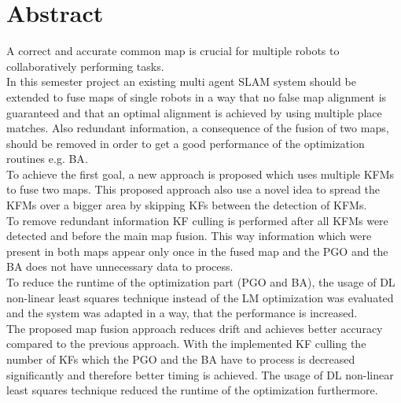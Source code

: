 \chapter*{Abstract}

A correct and accurate common map is crucial for multiple robots to collaboratively performing tasks.\\

In this semester project an existing multi agent \ac{SLAM} system should be extended to fuse maps of single robots in a way that no false map alignment is guaranteed and that an optimal alignment is achieved by using multiple place matches. Also redundant information, a consequence of the fusion of two maps, should be removed in order to get a good performance of the optimization routines e.g. \ac{BA}.\\

To achieve the first goal, a new approach is proposed which uses multiple \acfp{KFM} to fuse two maps. This proposed approach also use a novel idea to spread the \acp{KFM} over a bigger area by skipping \acfp{KF} between the detection of \acp{KFM}.\\
To remove redundant information \ac{KF} culling is performed after all \acp{KFM} were detected and before the main map fusion. This way information which were present in both maps appear only once in the fused map and the \ac{PGO} and the \ac{BA} does not have unnecessary data to process.\\
To reduce the runtime of the optimization part (\ac{PGO} and \ac{BA}), the usage of \acf{DL} non-linear least squares technique instead of the \acf{LM} optimization was evaluated and the system was adapted in a way, that the performance is increased.\\

The proposed map fusion approach reduces drift and achieves better accuracy compared to the previous approach. With the implemented \ac{KF} culling the number of \acp{KF} which the \ac{PGO} and the \ac{BA} have to process is decreased significantly and therefore better timing is achieved. The usage of \ac{DL} non-linear least squares technique reduced the runtime of the optimization furthermore.
